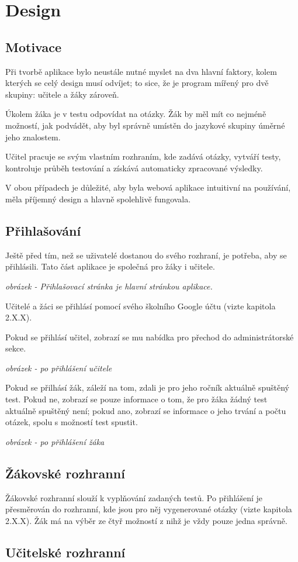 \hypertarget{Design}{\chapter{Design}}

\section{Motivace}

Při tvorbě aplikace bylo neustále nutné myslet na dva hlavní faktory, kolem kterých se celý design musí odvíjet; to sice, že je program mířený pro dvě skupiny: učitele a žáky zároveň.

Úkolem žáka je v testu odpovídat na otázky. Žák by měl mít co nejméně možností, jak podvádět, aby byl správně umístěn do jazykové skupiny úměrné jeho znalostem.

Učitel pracuje se svým vlastním rozhraním, kde zadává otázky, vytváří testy, kontroluje průběh testování a získává automaticky zpracované výsledky.

V obou případech je důležité, aby byla webová aplikace intuitivní na používání, měla příjemný design a hlavně spolehlivě fungovala.

\section{Přihlašování}

Ještě před tím, než se uživatelé dostanou do svého rozhraní, je potřeba, aby se přihlásili. Tato část aplikace je společná pro žáky i učitele. 

\textit{obrázek - Přihlašovací stránka je hlavní stránkou aplikace. }

Učitelé a žáci se přihlásí pomocí svého školního Google účtu (vizte kapitola 2.X.X).

Pokud se přihlásí učitel, zobrazí se mu nabídka pro přechod do administrátorské sekce.

\textit{obrázek - po přihlášení učitele}

Pokud se přilhásí žák, záleží na tom, zdali je pro jeho ročník aktuálně spuštěný test. Pokud ne, zobrazí se pouze informace o tom, že pro žáka žádný test aktuálně spuštěný není; pokud ano, zobrazí se informace o jeho trvání a počtu otázek, spolu s možností test spustit.

\textit{obrázek - po přihlášení žáka}

\section{Žákovské rozhranní}

Žákovské rozhranní slouží k vyplňování zadaných testů. Po přihlášení je přesměrován do rozhranní, kde jsou pro něj vygenerované otázky (vizte kapitola 2.X.X). Žák má na výběr ze čtyř možností z nihž je vždy pouze jedna správně.

\section{Učitelské rozhranní}